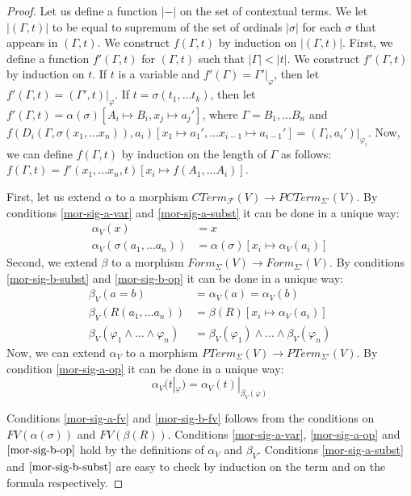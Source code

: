 \documentclass[reqno]{amsart}
\theoremstyle{definition}
\theoremstyle{remark}
\numberwithin{figure}{section}
\begin{document}
\begin{proof}
Let us define a function $|-|$ on the set of contextual terms.
We let $|(\Gamma,t)|$ to be equal to supremum of the set of ordinals $|\sigma|$ for each $\sigma$ that appears in $(\Gamma,t)$.
We construct $f(\Gamma,t)$ by induction on $|(\Gamma,t)|$.
First, we define a function $f'(\Gamma,t)$ for $(\Gamma,t)$ such that $|\Gamma| < |t|$.
We construct $f'(\Gamma,t)$ by induction on $t$.
If $t$ is a variable and $f'(\Gamma) = \Gamma'|_\varphi$, then let $f'(\Gamma,t) = (\Gamma',t)|_\varphi$.
If $t = \sigma(t_1, \ldots t_k)$, then let  $f'(\Gamma,t) = \alpha(\sigma)[A_i \mapsto B_i, x_j \mapsto a_j']$,
    where $\Gamma = B_1, \ldots B_n$ and $f(D_i(\Gamma,\sigma(x_1, \ldots x_n)),a_i)[x_1 \mapsto a_1', \ldots x_{i-1} \mapsto a_{i-1}'] = (\Gamma_i,a_i')|_{\varphi_i}$.
Now, we can define $f(\Gamma,t)$ by induction on the length of $\Gamma$ as follows: $f(\Gamma,t) = f'(x_1, \ldots x_n, t)[x_i \mapsto f(A_1, \ldots A_i)]$.

First, let us extend $\alpha$ to a morphism $CTerm_\mathcal{F}(V) \to PCTerm_{\Sigma'}(V)$.
By conditions \eqref{mor-sig-a-var} and \eqref{mor-sig-a-subst} it can be done in a unique way:
\begin{align*}
\alpha_V(x) & = x \\
\alpha_V(\sigma(a_1, \ldots a_n)) & = \alpha(\sigma)[x_i \mapsto \alpha_V(a_i)]
\end{align*}
Second, we extend $\beta$ to a morphism $Form_\Sigma(V) \to Form_{\Sigma'}(V)$.
By conditions \eqref{mor-sig-b-subst} and \eqref{mor-sig-b-op} it can be done in a unique way:
\begin{align*}
\beta_V(a = b) & = \alpha_V(a) = \alpha_V(b) \\
\beta_V(R(a_1, \ldots a_n)) & = \beta(R)[x_i \mapsto \alpha_V(a_i)] \\
\beta_V(\varphi_1 \land \ldots \land \varphi_n) & = \beta_V(\varphi_1) \land \ldots \land \beta_V(\varphi_n)
\end{align*}
Now, we can extend $\alpha_V$ to a morphism $PTerm_\Sigma(V) \to PTerm_{\Sigma'}(V)$.
By condition \eqref{mor-sig-a-op} it can be done in a unique way:
\[ \alpha_V(t|_\varphi) = \alpha_V(t)|_{\beta_V(\varphi)} \]

Conditions \eqref{mor-sig-a-fv} and \eqref{mor-sig-b-fv} follows from the conditions on $FV(\alpha(\sigma))$ and $FV(\beta(R))$.
Conditions \eqref{mor-sig-a-var}, \eqref{mor-sig-a-op} and $\eqref{mor-sig-b-op}$ hold by the definitions of $\alpha_V$ and $\beta_V$.
Conditions \eqref{mor-sig-a-subst} and $\eqref{mor-sig-b-subst}$ are easy to check by induction on the term and on the formula respectively.
\end{proof}
\end{document}
